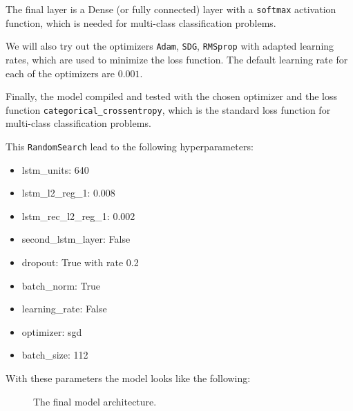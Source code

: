 The final layer is a Dense (or fully connected) layer with a \texttt{softmax} activation function, which is needed for multi-class classification problems.

We will also try out the optimizers \texttt{Adam}, \texttt{SDG}, \texttt{RMSprop} with adapted learning rates, which are used to minimize the loss function.
The default learning rate for each of the optimizers are \(0.001\).

Finally, the model compiled and tested with the chosen optimizer and the loss function \texttt{categorical\_crossentropy}, which is the standard loss function for multi-class classification problems.

This \texttt{RandomSearch} lead to the following hyperparameters:
\begin{itemize}
    \item lstm\_units: 640
    \item lstm\_l2\_reg\_1: 0.008
    \item lstm\_rec\_l2\_reg\_1: 0.002
    \item second\_lstm\_layer: False
    \item dropout: True with rate 0.2
    \item batch\_norm: True
    \item learning\_rate: False
    \item optimizer: sgd
    \item batch\_size: 112
\end{itemize}

With these parameters the model looks like the following:
\begin{figure}[h!]
    \centering
    
    \caption{The final model architecture.}
    \label{final_model}
\end{figure}



